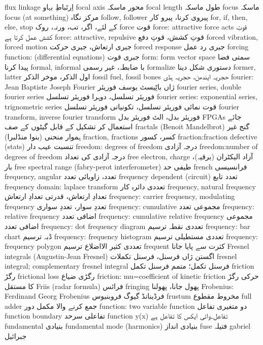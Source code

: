 flux linkage	اِرتَباطِ بہاو
focal axis	محور ماسکہ
focal length	طول ماسکہ
focus	ماسکہ
focus (at something)	مرکز نگاہ
follow, follower	پیروی کرنا، پیرو کار
for, if, then, else, stop	کے لئے، اگر، تب، ورنہ، روک
force	قوت
force: attractive force acts	قوتِ کشش عمل کرتا ہے
force: attractive, repulsive	قوتِ کشش، قوتِ دفع
forced vibration, forced motion	جبری ارتعاش، جبری حرکت
forced response	جبری رد عمل
forcing function: (differential equations)	جبری قوت
form: form vector space	سمتی فضا پیدا کرنا
formal, informal	با ضابطہ، غیر رسمی
formalize	دستوری شکل دینا
former, latter	اول الذکر، موخر الذکر
fossil fuel, fossil bones	حجریہ ایندھن، حجریہ ہڈی
fourier: Jean Baptiste Joseph Fourier	ژاں باٹِیسٹ یوسف فوریئر
fourier series, double fourier series	فوریئر تسلسل، دوہرا فوریئر تسلسل
fourier series: exponential series, trignometric series	قوت نمائی فوریئر تسلسل، تکونیاتی فوریئر تسلسل
fourier transform, inverse fourier transform	فوریئر بدل، الٹ فوریئر بدل
FPGAs	جائے استعمال کر تشکیل کے قابل گیٹوں کے صف
fractals (Benoit Mandelbrot)	گنج غیر ہموار منحنی (بنوا منڈلبرا)
fraction, fractions	کسر، کسور
fraction:fraction defective (stats)	تنسبت عیب دار
freedom: degrees of freedom	درجہ آزادی
freedom:number of degrees of freedom	درجہ آزادی کی تعداد
free electron, charge	آزاد الیکٹران (برقیہ)، بار
free spectral range (fabry-perot interferometer)	طیفی حد
french	فرانسیسی
frequency, angular	تعدد، زاویائی تعدد
frequency dependent (circuit)	تعدد تابع
frequency domain: laplace transform	تعددی دائرہ کار
frequency, natural frequency	تعدادِ ارتعاش، قدرتی تعدادِ ارتعاش
frequency: carrier frequency, modulating frequency	تعددِ سوار، تعددِ سواری
frequency: cumulative	مجموعی تعدد
frequency: relative frequency	اضافی تعدد
frequency: cumulative relative frequency	مجموعی اضافی تعدد
frequency: dot frequency diagram	تعددی نقطہ ترسیم
frequency: bar chart	ڈبہ ترسیم
frequency: frequency histogram	تعددی مستطیلی ترسیم
frequency: frequency polygon	تعددی کثیر الااضلاع ترسیم
frequent	کثرت سے پایا جانا
Fresnel integrals  (Augustin-Jean Fresnel)	اگستن ژاں فرسنل، فرسنل تکملات
fresnel integral; complementary fresnel integral	فرسنل تکمل؛ متمم فرسنل تکمل
friction	رگڑ
frictional loss	رگڑی ضیاع
friction: mu=coefficient of kinetic friction	حرکی رگڑ کا مستقل
Friis  (radar formula)	فرائس
fringing	پھول جانا، پھولنا
Frobenius: Ferdinand Georg Frobenius	فرڈینانڈ گیوگ فروبنیوس
frustum	مخروط مقطوع
full adder	جمع کرنے والا مکمل دور
function: two variable function	دو متغیری تفاعل
function boundary	تفاعلی سرحد
function y(x)	تفاعل۔وائی ایکس کا تفاعل ہے
fundamental	بنیادی
fundamental mode (harmonics)	بنیادی انداز
fuse	فتیلہ
gabriel	جبرائیل

